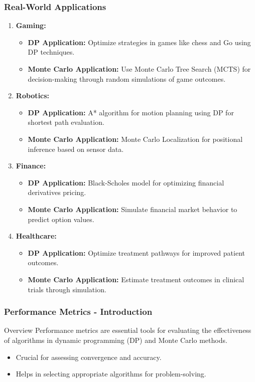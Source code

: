 \documentclass[aspectratio=169]{beamer}
\begin{document}
\begin{frame}[fragile]
    \frametitle{Real-World Applications}
    \begin{enumerate}
        \item \textbf{Gaming:}
            \begin{itemize}
                \item \textbf{DP Application:} Optimize strategies in games like chess and Go using DP techniques.
                \item \textbf{Monte Carlo Application:} Use Monte Carlo Tree Search (MCTS) for decision-making through random simulations of game outcomes.
            \end{itemize}
        \item \textbf{Robotics:}
            \begin{itemize}
                \item \textbf{DP Application:} A* algorithm for motion planning using DP for shortest path evaluation.
                \item \textbf{Monte Carlo Application:} Monte Carlo Localization for positional inference based on sensor data.
            \end{itemize}
        \item \textbf{Finance:}
            \begin{itemize}
                \item \textbf{DP Application:} Black-Scholes model for optimizing financial derivatives pricing.
                \item \textbf{Monte Carlo Application:} Simulate financial market behavior to predict option values.
            \end{itemize}
        \item \textbf{Healthcare:}
            \begin{itemize}
                \item \textbf{DP Application:} Optimize treatment pathways for improved patient outcomes.
                \item \textbf{Monte Carlo Application:} Estimate treatment outcomes in clinical trials through simulation.
            \end{itemize}
    \end{enumerate}
\end{frame}

\begin{frame}[fragile]
    \frametitle{Performance Metrics - Introduction}
    \begin{block}{Overview}
        Performance metrics are essential tools for evaluating the effectiveness of algorithms in dynamic programming (DP) and Monte Carlo methods. 
    \end{block}

    \begin{itemize}
        \item Crucial for assessing convergence and accuracy.
        \item Helps in selecting appropriate algorithms for problem-solving.
    \end{itemize}
\end{frame}
\end{document}
